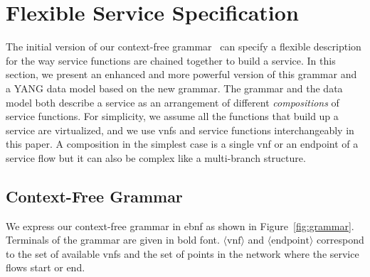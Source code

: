 \documentclass{sig-alternate-per}
\begin{document}
\section{Flexible Service Specification}
\label{sec:specification}

The initial version of our context-free grammar~\cite{mehraghdam2014specifying} can specify a 
flexible description for the way service functions are 
chained together to build a service. In this section, we present an enhanced and 
more powerful version of this grammar and a YANG data model based on the new grammar. 
The grammar and the data model both describe a service as an arrangement of different
\emph{compositions} of service functions. For simplicity, we assume all the 
functions that build up a service are virtualized, and we use \acp{vnf} and service
functions interchangeably in this paper. A composition in the simplest case is a single
\ac{vnf} or an endpoint of a service flow but it can also be complex like a multi-branch
structure.


\subsection{Context-Free Grammar}
\label{subsec:grammar}

We express our context-free grammar in \ac{ebnf} as shown in Figure~\ref{fig:grammar}.
Terminals of the grammar are given in bold font. $\langle\text{vnf}\rangle$
and $\langle\text{endpoint}\rangle$ correspond to the set of available \acp{vnf}
and the set of points in the network where the service flows
start or end.
\end{document}
